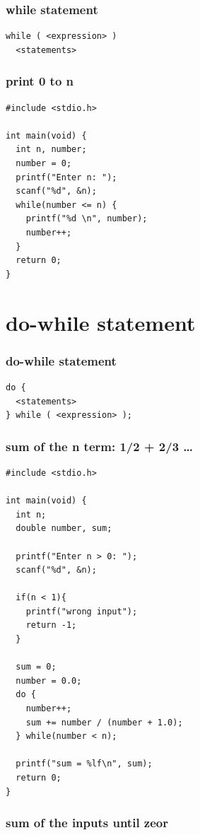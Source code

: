 \documentclass{../c-lecture}
\begin{document}
\begin{frame}[fragile]
  \frametitle{while statement}
  \begin{verbatim}
while ( <expression> )
  <statements>
  \end{verbatim}
\end{frame}

\begin{frame}[fragile]
  \frametitle{print 0 to n}
  \begin{verbatim}
#include <stdio.h>

int main(void) {
  int n, number;
  number = 0;
  printf("Enter n: ");
  scanf("%d", &n);
  while(number <= n) {
    printf("%d \n", number);
    number++;
  }
  return 0;
}
  \end{verbatim}
\end{frame}

\section{do-while statement}

\begin{frame}[fragile]
  \frametitle{do-while statement}
  \begin{verbatim}
do {
  <statements>
} while ( <expression> );
  \end{verbatim}
\end{frame}

\begin{frame}[fragile]
  \frametitle{sum of the n term: 1/2 + 2/3 \ldots}
  \scriptsize
  \begin{verbatim}
#include <stdio.h>

int main(void) {
  int n;
  double number, sum;

  printf("Enter n > 0: ");
  scanf("%d", &n);

  if(n < 1){
    printf("wrong input");
    return -1;
  }

  sum = 0;
  number = 0.0;
  do {
    number++;
    sum += number / (number + 1.0);
  } while(number < n);

  printf("sum = %lf\n", sum);
  return 0;
}
  \end{verbatim}
\end{frame}

\begin{frame}[fragile]
  \frametitle{sum of the inputs until zeor}
  \scriptsize
  \inputminted[bgcolor=Black]{c}{./src/do-while-read.c}
\end{frame}
\end{document}
